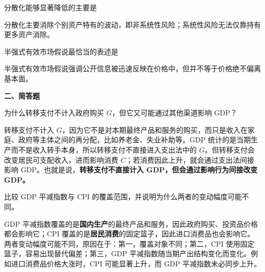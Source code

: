 \begin{question}
分散化能够显著降低的主要是
\begin{choiceoptions}[2]
\end{choiceoptions}
\begin{solution}
分散化主要消除个别资产特有的波动，即非系统性风险；系统性风险无法仅靠持有更多资产消除。
\end{solution}
\end{question}

\begin{question}
半强式有效市场假说最恰当的表述是
\begin{choiceoptions}[2]
\end{choiceoptions}
\begin{solution}
半强式有效市场假说强调公开信息被迅速反映在价格中，但并不等于价格绝不偏离基本面。
\end{solution}
\end{question}

\textbf{二、简答题}

\begin{question}
为什么转移支付不计入政府购买 $G$，但它又可能通过其他渠道影响 GDP？

\begin{solution}
转移支付不计入 $G$，因为它不是对本期最终产品和服务的购买，而只是收入在家庭、政府等主体之间的再分配，比如养老金、失业补助等。GDP 统计的是当期生产而不是收入转手本身，所以转移支付不直接进入支出法中的 $G$。但转移支付会改变居民可支配收入，进而影响消费 $C$；若消费因此上升，就会通过支出法间接影响 GDP。也就是说，\textbf{转移支付不直接计入 GDP，但会通过影响行为间接改变 GDP。}
\end{solution}
\end{question}

\begin{question}
比较 GDP 平减指数与 CPI 的覆盖范围，并说明为什么两者的变动幅度可能不同。

\begin{solution}
GDP 平减指数覆盖的是\textbf{国内生产}的最终产品和服务，因此政府购买、投资品价格都会影响它；CPI 覆盖的是\textbf{居民消费}的固定篮子，因此进口消费品也会影响它。两者变动幅度可能不同，原因在于：第一，覆盖对象不同；第二，CPI 使用固定篮子，容易出现替代偏差；第三，GDP 平减指数随当期产出结构变化而变化。例如进口消费品价格大涨时，CPI 可能显著上升，而 GDP 平减指数未必同步上升。
\end{solution}
\end{question}

